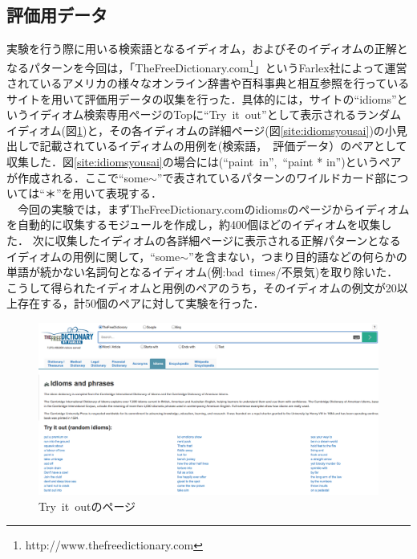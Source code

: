 \documentclass[12pt,twoside, fleqn]{ujbook}
\begin{document}
	\subsection{評価用データ}
	\label{text:hyouka-data}
	実験を行う際に用いる検索語となるイディオム，およびそのイディオムの正解となるパターンを今回は，「TheFreeDictionary.com\footnote{http://www.thefreedictionary.com}」というFarlex社によって運営されているアメリカの様々なオンライン辞書や百科事典と相互参照を行っているサイトを用いて評価用データの収集を行った．具体的には，サイトの``idioms''というイディオム検索専用ページのTopに``Try\ it\ out''として表示されるランダムイディオム(図\ref{site:tryitout})と，その各イディオムの詳細ページ(図\ref{site:idiomsyousai})の小見出しで記載されているイディオムの用例を(検索語，\ 評価データ）のペアとして収集した．図\ref{site:idiomsyousai}の場合には(``paint\ in'',\ ``paint * in'')というペアが作成される．ここで``some$\sim$''で表されているパターンのワイルドカード部については``＊''を用いて表現する．\\
	　今回の実験では，まずTheFreeDictionary.comのidiomsのページからイディオムを自動的に収集するモジュールを作成し，約400個ほどのイディオムを収集した．
	次に収集したイディオムの各詳細ページに表示される正解パターンとなるイディオムの用例に関して，``some$\sim$''を含まない，つまり目的語などの何らかの単語が続かない名詞句となるイディオム(例:bad\ times/不景気)を取り除いた．
	こうして得られたイディオムと用例のペアのうち，そのイディオムの例文が20以上存在する，計50個のペアに対して実験を行った．


	\newpage
	\begin{figure}[htbp]
	\begin{center}
		\includegraphics [clip, width=16cm]{./img/tryitout.png}
		\caption{Try\ it\ outのページ}
		\label{site:tryitout}
	\end{center}
	\end{figure}	
\end{document}
